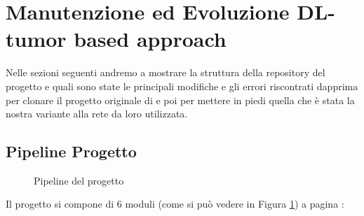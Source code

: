\section{Manutenzione ed Evoluzione DL-tumor based approach }
\label{appendix}
Nelle sezioni seguenti andremo a mostrare la struttura della repository del progetto e quali sono state le 
principali modifiche e gli errori riscontrati dapprima per clonare il progetto originale di \cite{lyu2018deep} e poi 
per mettere in piedi quella che è stata la nostra variante alla rete da loro utilizzata. 

\subsection{Pipeline Progetto}
\begin{figure}[hbpt!]
		\centering
		
  		\caption{Pipeline del progetto}
        \label{fig:pipeline}
\end{figure}
Il progetto si compone di 6 moduli (come si può vedere in Figura \ref{fig:pipeline}) a pagina \pageref{fig:pipeline}:
